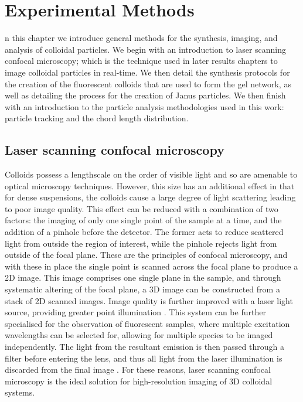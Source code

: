 %
% 
%
\let\textcircled=\pgftextcircled
\chapter{Experimental Methods}
\label{chap:expMethods}

n this chapter we introduce general methods for the synthesis, imaging, and analysis of colloidal particles. We begin with an introduction to laser scanning confocal microscopy; which is the technique used in later results chapters to image colloidal particles in real-time. We then detail the synthesis protocols for the creation of the fluorescent colloids that are used to form the gel network, as well as detailing the process for the creation of Janus particles. We then finish with an introduction to the particle analysis methodologies used in this work: particle tracking and the chord length distribution.




\section{Laser scanning confocal microscopy}
Colloids possess a lengthscale on the order of visible light and so are amenable to optical microscopy techniques. However, this size has an additional effect in that for dense suspensions, the colloids cause a large degree of light scattering leading to poor image quality. This effect can be reduced with a combination of two factors: the imaging of only one single point of the sample at a time, and the addition of a pinhole before the detector. The former acts to reduce scattered light from outside the region of interest, while the pinhole rejects light from outside of the focal plane. These are the principles of confocal microscopy, and with these in place the single point is scanned across the focal plane to produce a 2D image. This image comprises one single plane in the sample, and through systematic altering of the focal plane, a 3D image can be constructed from a stack of 2D scanned images. Image quality is further improved with a laser light source, providing greater point illumination \cite{paddock1999}. This system can be further specialised for the observation of fluorescent samples, where multiple excitation wavelengths can be selected for, allowing for multiple species to be imaged independently. The light from the resultant emission is then passed through a filter before entering the lens, and thus all light from the laser illumination is discarded from the final image \cite{paddock1999}. For these reasons, laser scanning confocal microscopy is the ideal solution for high-resolution  imaging of 3D colloidal systems.



